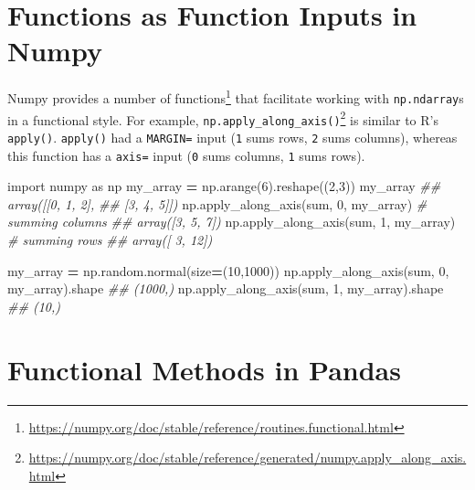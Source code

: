 \documentclass[
  12pt,
  krantz2]{krantz}
\makeatletter
\newenvironment{Shaded}{\begin{snugshade}}{\end{snugshade}}
\newcommand{\BuiltInTok}[1]{#1}
\newcommand{\CommentTok}[1]{\textcolor[rgb]{0.37,0.37,0.37}{\textit{#1}}}
\newcommand{\DecValTok}[1]{\textcolor[rgb]{0.06,0.06,0.06}{#1}}
\newcommand{\ImportTok}[1]{#1}
\newcommand{\NormalTok}[1]{#1}
\newcommand{\OperatorTok}[1]{\textcolor[rgb]{0.43,0.43,0.43}{\textbf{#1}}}
\renewcommand{\href}[2]{#2\footnote{\url{#1}}}
\newenvironment{kframe}{%
\medskip{}
\setlength{\fboxsep}{.8em}
 \def\at@end@of@kframe{}%
 \ifinner\ifhmode%
  \def\at@end@of@kframe{\end{minipage}}%
  \begin{minipage}{\columnwidth}%
 \fi\fi%
 \def\FrameCommand##1{\hskip\@totalleftmargin \hskip-\fboxsep
 \colorbox{shadecolor}{##1}\hskip-\fboxsep
     \hskip-\linewidth \hskip-\@totalleftmargin \hskip\columnwidth}%
 \MakeFramed {\advance\hsize-\width
   \@totalleftmargin\z@ \linewidth\hsize
   \@setminipage}}%
 {\par\unskip\endMakeFramed%
 \at@end@of@kframe}
\renewenvironment{Shaded}{\begin{kframe}}{\end{kframe}}
\makeatother
\begin{document}
\hypertarget{functions-as-function-inputs-in-numpy}{%
\section{Functions as Function Inputs in Numpy}\label{functions-as-function-inputs-in-numpy}}

Numpy provides a \href{https://numpy.org/doc/stable/reference/routines.functional.html}{number of functions} that facilitate working with \texttt{np.ndarray}s in a functional style. For example, \href{https://numpy.org/doc/stable/reference/generated/numpy.apply_along_axis.html}{\texttt{np.apply\_along\_axis()}} is similar to R's \texttt{apply()}. \texttt{apply()} had a \texttt{MARGIN=} input (\texttt{1} sums rows, \texttt{2} sums columns), whereas this function has a \texttt{axis=} input (\texttt{0} sums columns, \texttt{1} sums rows).

\begin{Shaded}
\begin{Highlighting}[]
\ImportTok{import}\NormalTok{ numpy }\ImportTok{as}\NormalTok{ np}
\NormalTok{my\_array }\OperatorTok{=}\NormalTok{ np.arange(}\DecValTok{6}\NormalTok{).reshape((}\DecValTok{2}\NormalTok{,}\DecValTok{3}\NormalTok{))}
\NormalTok{my\_array}
\CommentTok{\#\# array([[0, 1, 2],}
\CommentTok{\#\#        [3, 4, 5]])}
\NormalTok{np.apply\_along\_axis(}\BuiltInTok{sum}\NormalTok{, }\DecValTok{0}\NormalTok{, my\_array) }\CommentTok{\# summing columns}
\CommentTok{\#\# array([3, 5, 7])}
\NormalTok{np.apply\_along\_axis(}\BuiltInTok{sum}\NormalTok{, }\DecValTok{1}\NormalTok{, my\_array) }\CommentTok{\# summing rows}
\CommentTok{\#\# array([ 3, 12])}
\end{Highlighting}
\end{Shaded}

\begin{Shaded}
\begin{Highlighting}[]
\NormalTok{my\_array }\OperatorTok{=}\NormalTok{ np.random.normal(size}\OperatorTok{=}\NormalTok{(}\DecValTok{10}\NormalTok{,}\DecValTok{1000}\NormalTok{))}
\NormalTok{np.apply\_along\_axis(}\BuiltInTok{sum}\NormalTok{, }\DecValTok{0}\NormalTok{, my\_array).shape }
\CommentTok{\#\# (1000,)}
\NormalTok{np.apply\_along\_axis(}\BuiltInTok{sum}\NormalTok{, }\DecValTok{1}\NormalTok{, my\_array).shape}
\CommentTok{\#\# (10,)}
\end{Highlighting}
\end{Shaded}

\hypertarget{functional-methods-in-pandas}{%
\section{Functional Methods in Pandas}\label{functional-methods-in-pandas}}
\end{document}
